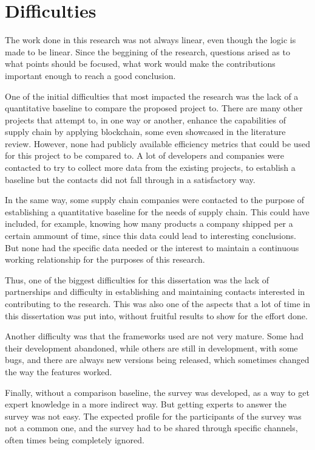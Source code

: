 \section{Difficulties}

The work done in this research was not always linear, even though the logic is made to be linear. Since the beggining of the research, questions arised as to what points should be focused, what work would make the contributions important enough to reach a good conclusion. 

One of the initial difficulties that most impacted the research was the lack of a quantitative baseline to compare the proposed project to. There are many other projects that attempt to, in one way or another, enhance the capabilities of supply chain by applying blockchain, some even showcased in the literature review. However, none had publicly available efficiency metrics that could be used for this project to be compared to. A lot of developers and companies were contacted to try to collect more data from the existing projects, to establish a baseline but the contacts did not fall through in a satisfactory way. 

In the same way, some supply chain companies were contacted to the purpose of establishing a quantitative baseline for the needs of supply chain. This could have included, for example, knowing how many products a company shipped per a certain ammount of time, since this data could lead to interesting conclusions. But none had the specific data needed or the interest to maintain a continuous working relationship for the purposes of this research.

Thus, one of the biggest difficulties for this dissertation was the lack of partnerships and difficulty in establishing and maintaining contacts interested in contributing to the research. This was also one of the aspects that a lot of time in this dissertation was put into, without fruitful results to show for the effort done.


Another difficulty was that the frameworks used are not very mature. Some had their development abandoned, while others are still in development, with some bugs, and there are always new versions being released, which sometimes changed the way the features worked.

Finally, without a comparison baseline, the survey was developed, as a way to get expert knowledge in a more indirect way. But getting experts to answer the survey was not easy. The expected profile for the participants of the survey was not a common one, and the survey had to be shared through specific channels, often times being completely ignored.

